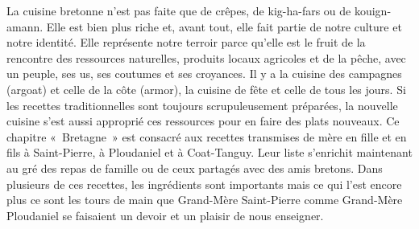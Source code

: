 La cuisine bretonne n’est pas faite que de crêpes, de kig-ha-fars ou de kouign-amann. Elle est bien plus riche et, avant tout, elle fait partie de notre culture et notre identité. Elle représente notre terroir parce qu’elle est le fruit de la rencontre des ressources naturelles, produits locaux agricoles et de la pêche, avec un peuple, ses us, ses coutumes et ses croyances. Il y a la cuisine des campagnes (argoat) et celle de la côte (armor), la cuisine de fête et celle de tous les jours. Si les recettes traditionnelles sont toujours scrupuleusement préparées, la nouvelle cuisine s’est aussi approprié ces ressources pour en faire des plats nouveaux.
Ce chapitre « Bretagne » est consacré aux recettes transmises de mère en fille et en fils à Saint-Pierre, à Ploudaniel et à Coat-Tanguy. Leur liste s’enrichit maintenant au gré des repas de famille ou de ceux partagés avec des amis bretons. Dans plusieurs de ces recettes, les ingrédients sont importants mais ce qui l’est encore plus ce sont les tours de main que Grand-Mère Saint-Pierre comme Grand-Mère Ploudaniel se faisaient un devoir et un plaisir de nous enseigner.
